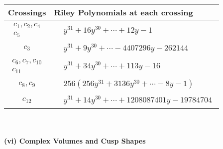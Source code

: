 \documentclass[1p]{elsarticle_modified}
\theoremstyle{definition}
\begin{document}
\begin{tabular}{m{50pt}|m{274pt}}
Crossings & \hspace{64pt}Riley Polynomials at each crossing \\
\hline $$\begin{aligned}c_{1},c_{2},c_{4}\\c_{5}\end{aligned}$$&$\begin{aligned}
&y^{31}+16 y^{30}+\cdots+12 y-1
\end{aligned}$\\
\hline $$\begin{aligned}c_{3}\end{aligned}$$&$\begin{aligned}
&y^{31}+9 y^{30}+\cdots-4407296 y-262144
\end{aligned}$\\
\hline $$\begin{aligned}c_{6},c_{7},c_{10}\\c_{11}\end{aligned}$$&$\begin{aligned}
&y^{31}+34 y^{30}+\cdots+113 y-16
\end{aligned}$\\
\hline $$\begin{aligned}c_{8},c_{9}\end{aligned}$$&$\begin{aligned}
&256(256 y^{31}+3136 y^{30}+\cdots-8 y-1)
\end{aligned}$\\
\hline $$\begin{aligned}c_{12}\end{aligned}$$&$\begin{aligned}
&y^{31}+14 y^{30}+\cdots+1208087401 y-19784704
\end{aligned}$\\
\hline
\end{tabular}\\~\\
\newpage\flushleft \textbf{(vi) Complex Volumes and Cusp Shapes}
\end{document}
